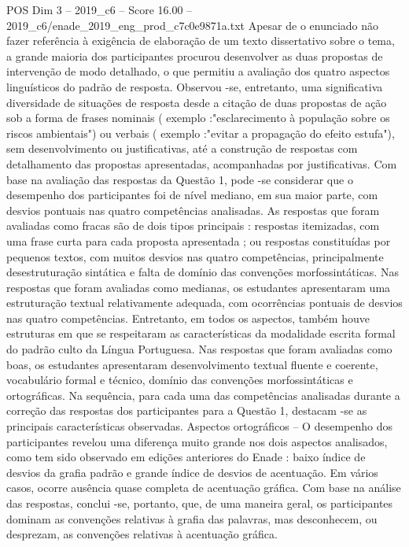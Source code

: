 \begin{textsample}{POS Dim 3 – 2019\_c6 – Score 16.00 – 2019\_c6/enade\_2019\_eng\_prod\_c7c0e9871a.txt}
Apesar de o enunciado não fazer referência à exigência de elaboração de um texto dissertativo sobre o tema, a grande maioria dos participantes procurou desenvolver as duas propostas de intervenção de modo detalhado, o que permitiu a avaliação dos quatro aspectos linguísticos do padrão de resposta.
Observou -se, entretanto, uma significativa diversidade de situações de resposta desde a citação de duas propostas de ação sob a forma de frases nominais ( exemplo :"esclarecimento à população sobre os riscos ambientais") ou verbais ( exemplo :"evitar a propagação do efeito estufa"), sem desenvolvimento ou justificativas, até a construção de respostas com detalhamento das propostas apresentadas, acompanhadas por justificativas.
Com base na avaliação das respostas da Questão 1, pode -se considerar que o desempenho dos participantes foi de nível mediano, em sua maior parte, com desvios pontuais nas quatro competências analisadas.
As respostas que foram avaliadas como fracas são de dois tipos principais : respostas itemizadas, com uma frase curta para cada proposta apresentada ; ou respostas constituídas por pequenos textos, com muitos desvios nas quatro competências, principalmente desestruturação sintática e falta de domínio das convenções morfossintáticas.
Nas respostas que foram avaliadas como medianas, os estudantes apresentaram uma estruturação textual relativamente adequada, com ocorrências pontuais de desvios nas quatro competências.
Entretanto, em todos os aspectos, também houve estruturas em que se respeitaram as características da modalidade escrita formal do padrão culto da Língua Portuguesa.
Nas respostas que foram avaliadas como boas, os estudantes apresentaram desenvolvimento textual fluente e coerente, vocabulário formal e técnico, domínio das convenções morfossintáticas e ortográficas.
Na sequência, para cada uma das competências analisadas durante a correção das respostas dos participantes para a Questão 1, destacam -se as principais características observadas.
Aspectos ortográficos – O desempenho dos participantes revelou uma diferença muito grande nos dois aspectos analisados, como tem sido observado em edições anteriores do Enade : baixo índice de desvios da grafia padrão e grande índice de desvios de acentuação.
Em vários casos, ocorre ausência quase completa de acentuação gráfica.
Com base na análise das respostas, conclui -se, portanto, que, de uma maneira geral, os participantes dominam as convenções relativas à grafia das palavras, mas desconhecem, ou desprezam, as convenções relativas à acentuação gráfica.

\end{textsample}
